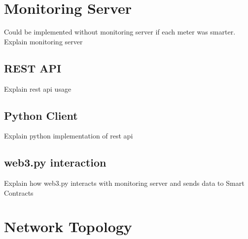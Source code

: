 \section{Monitoring Server}
Could be implemented without monitoring server if each meter was smarter. 
Explain monitoring server

\subsection{REST API} 
Explain rest api usage 

\subsection{Python Client}
Explain python implementation of rest api

\subsection{web3.py interaction}
Explain how web3.py interacts with monitoring server and sends data to Smart Contracts

\section{Network Topology}
